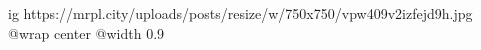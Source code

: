  
 
 
 
 

\ifcmt
  ig https://mrpl.city/uploads/posts/resize/w/750x750/vpw409v2izfejd9h.jpg
  @wrap center
  @width 0.9
\fi
